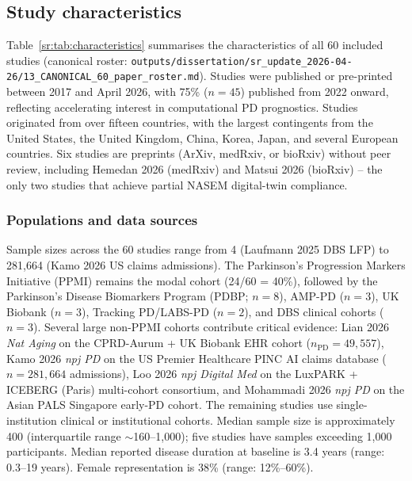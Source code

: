 \subsection{Study characteristics}
\label{sr:sec:results:characteristics}

Table~\ref{sr:tab:characteristics} summarises the characteristics of all 60 included studies (canonical roster: \texttt{outputs/dissertation/sr\_update\_2026-04-26/13\_CANONICAL\_60\_paper\_roster.md}). Studies were published or pre-printed between 2017 and April 2026, with 75\% ($n=45$) published from 2022 onward, reflecting accelerating interest in computational PD prognostics. Studies originated from over fifteen countries, with the largest contingents from the United States, the United Kingdom, China, Korea, Japan, and several European countries. Six studies are preprints (ArXiv, medRxiv, or bioRxiv) without peer review, including Hemedan 2026 (medRxiv) and Matsui 2026 (bioRxiv) -- the only two studies that achieve partial NASEM digital-twin compliance.

\subsubsection{Populations and data sources}
Sample sizes across the 60 studies range from 4 (Laufmann 2025 DBS LFP) to 281{,}664 (Kamo 2026 US claims admissions). The Parkinson's Progression Markers Initiative (PPMI) remains the modal cohort (24/60 = 40\%), followed by the Parkinson's Disease Biomarkers Program (PDBP; $n=8$), AMP-PD ($n=3$), UK Biobank ($n=3$), Tracking PD/LABS-PD ($n=2$), and DBS clinical cohorts ($n=3$). Several large non-PPMI cohorts contribute critical evidence: Lian 2026 \textit{Nat Aging} on the CPRD-Aurum + UK Biobank EHR cohort ($n_{\text{PD}} = 49{,}557$), Kamo 2026 \textit{npj PD} on the US Premier Healthcare PINC AI claims database ($n=281{,}664$ admissions), Loo 2026 \textit{npj Digital Med} on the LuxPARK + ICEBERG (Paris) multi-cohort consortium, and Mohammadi 2026 \textit{npj PD} on the Asian PALS Singapore early-PD cohort. The remaining studies use single-institution clinical or institutional cohorts. Median sample size is approximately 400 (interquartile range $\sim$160--1{,}000); five studies have samples exceeding 1{,}000 participants. Median reported disease duration at baseline is 3.4 years (range: 0.3--19 years). Female representation is 38\% (range: 12\%--60\%).


